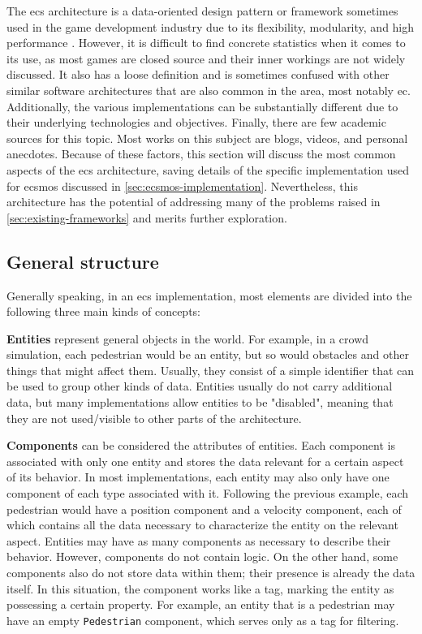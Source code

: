 \documentclass[twoside, 11pt]{article}
\begin{document}
The \gls{ecs} architecture is a data-oriented design pattern or framework sometimes used in the game development industry due to its flexibility, modularity, and high performance \cite{ecs}. However, it is difficult to find concrete statistics when it comes to its use, as most games are closed source and their inner workings are not widely discussed. It also has a loose definition and is sometimes confused with other similar software architectures that are also common in the area, most notably \gls{ec}. Additionally, the various implementations can be substantially different due to their underlying technologies and objectives. Finally, there are few academic sources for this topic. Most works on this subject are blogs, videos, and personal anecdotes. Because of these factors, this section will discuss the most common aspects of the \gls{ecs} architecture, saving details of the specific implementation used for \gls{ecsmos} discussed in \autoref{sec:ecsmos-implementation}. Nevertheless, this architecture has the potential of addressing many of the problems raised in \autoref{sec:existing-frameworks} and merits further exploration.

\subsection{General structure}

Generally speaking, in an \gls{ecs} implementation, most elements are divided into the following three main kinds of concepts: 

\textbf{Entities} represent general objects in the world. For example, in a crowd simulation, each pedestrian would be an entity, but so would obstacles and other things that might affect them. Usually, they consist of a simple identifier that can be used to group other kinds of data. Entities usually do not carry additional data, but many implementations allow entities to be "disabled", meaning that they are not used/visible to other parts of the architecture.


\textbf{Components} can be considered the attributes of entities. Each component is associated with only one entity and stores the data relevant for a certain aspect of its behavior. In most implementations, each entity may also only have one component of each type associated with it. Following the previous example, each pedestrian would have a position component and a velocity component, each of which contains all the data necessary to characterize the entity on the relevant aspect. Entities may have as many components as necessary to describe their behavior. However, components do not contain logic. On the other hand, some components also do not store data within them; their presence is already the data itself. In this situation, the component works like a tag, marking the entity as possessing a certain property. For example, an entity that is a pedestrian may have an empty \verb|Pedestrian| component, which serves only as a tag for filtering.
\end{document}
